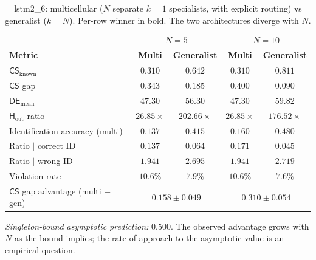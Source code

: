 \documentclass[11pt,a4paper]{article}
\newcommand{\CS}{\mathsf{CS}}
\newcommand{\DE}{\mathsf{DE}}
\newcommand{\Hout}{\mathsf{H}_{\mathrm{out}}}
\begin{document}
\begin{table}[H]
\centering
\caption{lstm2\_6: multicellular ($N$ separate $k = 1$ specialists, with explicit routing) vs generalist ($k = N$). Per-row winner in bold. The two architectures diverge with $N$.}
\label{tab:lstm2-6}
\renewcommand{\arraystretch}{1.25}
\vspace{4pt}
\begin{tabular}{l|cc|cc}
\toprule
& \multicolumn{2}{c|}{$N = 5$}
& \multicolumn{2}{c}{$N = 10$} \\
\textbf{Metric} & \textbf{Multi} & \textbf{Generalist}
                & \textbf{Multi} & \textbf{Generalist} \\
\midrule
$\CS_{\mathrm{known}}$              & $\mathbf{0.310}$  & $0.642$            & $\mathbf{0.310}$  & $0.811$ \\
$\CS$ gap                            & $\mathbf{0.343}$  & $0.185$            & $\mathbf{0.400}$  & $0.090$ \\
$\DE_{\mathrm{mean}}$                & $\mathbf{47.30}$  & $56.30$            & $\mathbf{47.30}$  & $59.82$ \\
$\Hout$ ratio                        & $\mathbf{26.85\times}$ & $202.66\times$ & $\mathbf{26.85\times}$ & $176.52\times$ \\
Identification accuracy (multi)      & $0.137$           & $\mathbf{0.415}$   & $0.160$           & $\mathbf{0.480}$ \\
Ratio $\mid$ correct ID              & $0.137$           & $\mathbf{0.064}$   & $0.171$           & $\mathbf{0.045}$ \\
Ratio $\mid$ wrong ID                & $\mathbf{1.941}$  & $2.695$            & $\mathbf{1.941}$  & $2.719$ \\
Violation rate                       & $\mathbf{10.6\%}$ & $7.9\%$            & $\mathbf{10.6\%}$ & $7.6\%$ \\
\midrule
$\CS$ gap advantage (multi $-$ gen) & \multicolumn{2}{c|}{$0.158 \pm 0.049$}
                                     & \multicolumn{2}{c}{$0.310 \pm 0.054$} \\
\bottomrule
\end{tabular}

\vspace{4pt}
\noindent\footnotesize\emph{Singleton-bound asymptotic prediction:} $0.500$. The observed advantage grows with $N$ as the bound implies; the rate of approach to the asymptotic value is an empirical question.
\end{table}
\end{document}

